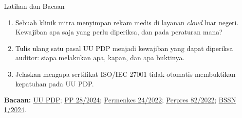 \documentclass[aspectratio=169, table, 12pt]{beamer}
\begin{document}
\begin{frame}{{\Large Latihan dan Bacaan}}
  \vspace{2pt}
  \footnotesize
  \begin{enumerate}
    \item Sebuah klinik mitra menyimpan rekam medis di layanan \textit{cloud} luar negeri. Kewajiban apa saja
          yang perlu diperiksa, dan pada peraturan mana?
    \item Tulis ulang satu pasal UU PDP menjadi kewajiban yang dapat diperiksa auditor: siapa melakukan apa,
          kapan, dan apa buktinya.
    \item Jelaskan mengapa sertifikat ISO/IEC 27001 tidak otomatis membuktikan kepatuhan pada UU PDP.
  \end{enumerate}

  \vspace{6pt}
  \textbf{Bacaan:} \href{https://peraturan.bpk.go.id/Details/229798/uu-no-27-tahun-2022}{UU PDP};
  \href{https://peraturan.bpk.go.id/Details/294077}{PP 28/2024};
  \href{https://peraturan.go.id/files/bn829-2022.pdf}{Permenkes 24/2022};
  \href{https://peraturan.go.id/files/ps82-2022.pdf}{Perpres 82/2022};
  \href{https://peraturan.go.id/files/peraturan-bssn-no-1-tahun-2024.pdf}{BSSN 1/2024}.
\end{frame}
\end{document}
